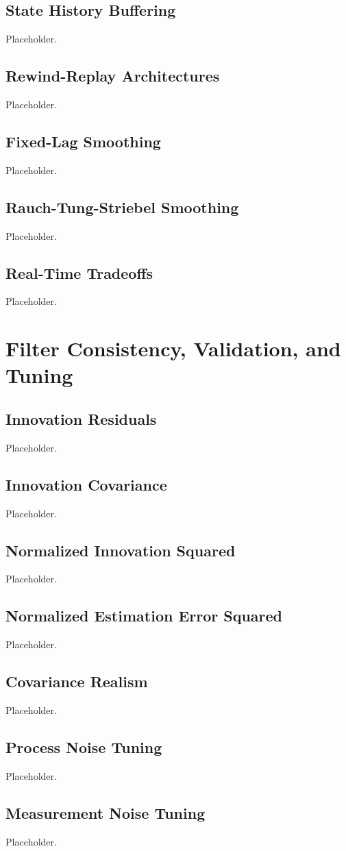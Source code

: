 \documentclass[11pt,oneside]{book}
\begin{document}
\section{State History Buffering}
Placeholder.
\section{Rewind-Replay Architectures}
Placeholder.
\section{Fixed-Lag Smoothing}
Placeholder.
\section{Rauch-Tung-Striebel Smoothing}
Placeholder.
\section{Real-Time Tradeoffs}
Placeholder.

\chapter{Filter Consistency, Validation, and Tuning}
\section{Innovation Residuals}
Placeholder.
\section{Innovation Covariance}
Placeholder.
\section{Normalized Innovation Squared}
Placeholder.
\section{Normalized Estimation Error Squared}
Placeholder.
\section{Covariance Realism}
Placeholder.
\section{Process Noise Tuning}
Placeholder.
\section{Measurement Noise Tuning}
Placeholder.
\end{document}
